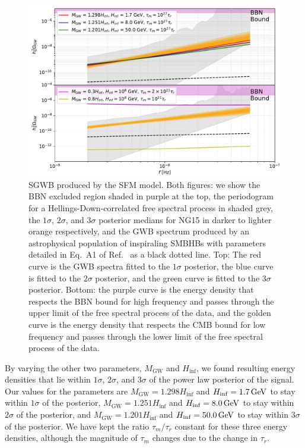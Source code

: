 \documentclass[prd,twocolumn,aps,psfig,nofootinbib,nobibnotes,superscriptaddress,preprintnumbers,times]{revtex4-2}
\newcommand{\GeV}{\,{\rm GeV}}
\begin{document}
\begin{figure}
\includegraphics[width=\textwidth]{fig3.pdf} 
\caption{SGWB produced by the SFM model. Both figures: we show the BBN excluded region shaded in purple at the top, the periodogram for a Hellings-Down-correlated free spectral process \cite{Agazie:2023} in shaded grey, the $1\sigma$, $2\sigma$, and $3\sigma$ posterior medians for NG15 \cite{Agazie:2023} in darker to lighter orange respectively, and the GWB spectrum produced by an astrophysical population of inspiraling SMBHBs with parameters detailed in Eq.\ A1 of Ref.\ \cite{Afzal:2023} as a black dotted line. Top: The red curve is the GWB spectra fitted to the $1\sigma$ posterior, the blue curve is fitted to the $2\sigma$ posterior, and the green curve is fitted to the $3\sigma$ posterior. Bottom: the purple curve is the energy density that respects the BBN bound for high frequency and passes through the upper limit of the free spectral process of the data, and the golden curve is the energy density that respects the CMB bound for low frequency and passes through the lower limit of the free spectral process of the data.} 
\label{fig:GWB}
\end{figure}

By varying the other two parameters, $M_{\text{GW}}$ and $H_{\inf}$, we found resulting energy densities that lie within $1\sigma$, $2\sigma$, and $3\sigma$ of the power law posterior of the signal. Our values for the parameters are $M_{\text{GW}} = 1.298H_{\inf}$ and $H_{\inf} =  1.7 \GeV$ to stay within $1\sigma$ of the posterior, $M_{\text{GW}} = 1.251H_{\inf}$ and $H_{\inf} = 8.0 \GeV$ to stay within $2\sigma$ of the posterior, and $M_{\text{GW}} = 1.201H_{\inf}$ and $H_{\inf} = 50.0 \GeV$ to stay within $3\sigma$ of the posterior. We have kept the ratio $\tau_m/\tau_r$ constant for these three energy densities, although the magnitude of $\tau_m$ changes due to the change in $\tau_r$. 
\end{document}
